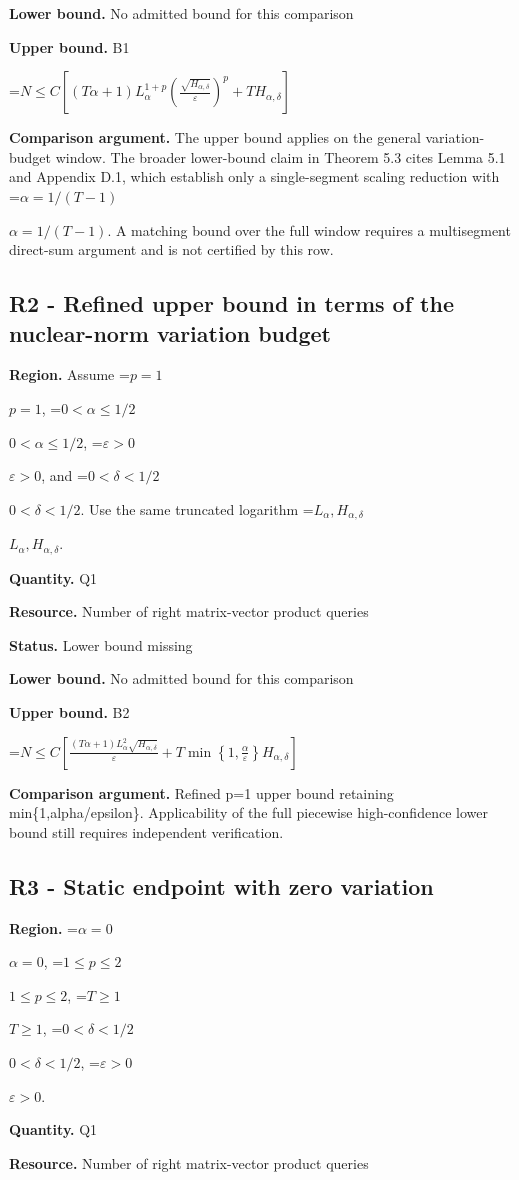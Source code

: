 \documentclass[10pt,a4paper]{article}
\newcommand{\AtlasMath}[1]{\par\begingroup\centering\setbox0=\hbox{$\displaystyle #1$}\ifdim\wd0>1.4\linewidth\typeout{ATLAS WIDE FORMULA: \the\wd0}\fi\ifdim\wd0>\linewidth\resizebox{\linewidth}{!}{\box0}\else\box0\fi\par\endgroup}
\newcommand{\AtlasInlineMath}[1]{\begingroup\setbox0=\hbox{$#1$}\ifdim\wd0>.4\linewidth\endgroup\AtlasMath{#1}\else\endgroup$#1$\fi}
\begin{document}
\textbf{Lower bound.} No admitted bound for this comparison

\textbf{Upper bound.} B1

\AtlasMath{N\le C\left[(T\alpha+1)L_\alpha^{1+p}\left(\frac{\sqrt{H_{\alpha,\delta}}}{\varepsilon}\right)^p+T H_{\alpha,\delta}\right]}
\textbf{Comparison argument.} The upper bound applies on the general variation-budget window. The broader lower-bound claim in Theorem 5.3 cites Lemma 5.1 and Appendix D.1, which establish only a single-segment scaling reduction with \AtlasInlineMath{\alpha=1/(T-1)}. A matching bound over the full window requires a multisegment direct-sum argument and is not certified by this row.

\subsection{R2 - Refined upper bound in terms of the nuclear-norm variation budget}
\textbf{Region.} Assume \AtlasInlineMath{p=1}, \AtlasInlineMath{0<\alpha\le1/2}, \AtlasInlineMath{\varepsilon>0}, and \AtlasInlineMath{0<\delta<1/2}. Use the same truncated logarithm \AtlasInlineMath{L_\alpha,H_{\alpha,\delta}}.

\textbf{Quantity.} Q1

\textbf{Resource.} Number of right matrix-vector product queries

\textbf{Status.} Lower bound missing

\textbf{Lower bound.} No admitted bound for this comparison

\textbf{Upper bound.} B2

\AtlasMath{N\le C\left[\frac{(T\alpha+1)L_\alpha^2\sqrt{H_{\alpha,\delta}}}{\varepsilon}+T\min\left\{1,\frac{\alpha}{\varepsilon}\right\}H_{\alpha,\delta}\right]}
\textbf{Comparison argument.} Refined p=1 upper bound retaining min\{1,alpha/epsilon\}. Applicability of the full piecewise high-confidence lower bound still requires independent verification.

\subsection{R3 - Static endpoint with zero variation}
\textbf{Region.} \AtlasInlineMath{\alpha=0}, \AtlasInlineMath{1\le p\le2}, \AtlasInlineMath{T\ge1}, \AtlasInlineMath{0<\delta<1/2}, \AtlasInlineMath{\varepsilon>0}.

\textbf{Quantity.} Q1

\textbf{Resource.} Number of right matrix-vector product queries
\end{document}
